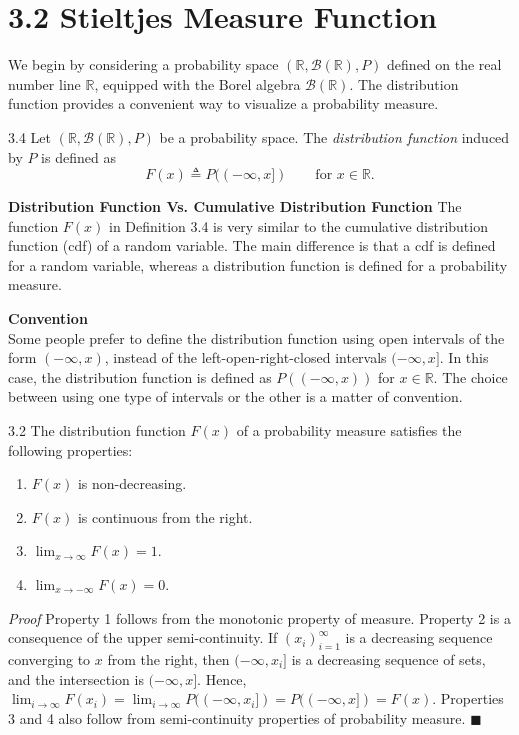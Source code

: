 \section*{3.2 Stieltjes Measure Function}

We begin by considering a probability space $(\mathbb{R}, \mathcal{B}(\mathbb{R}), P)$ defined on the real number line $\mathbb{R}$, equipped with the Borel algebra $\mathcal{B}(\mathbb{R})$. The distribution function provides a convenient way to visualize a probability measure.

\begin{defbox}{3.4}
Let $(\mathbb{R}, \mathcal{B}(\mathbb{R}), P)$ be a probability space. The \textit{distribution function} induced by $P$ is defined as
\[
F(x) \triangleq P((-\infty, x]) \qquad \text{for } x \in \mathbb{R}.
\]
\end{defbox}


\textbf{Distribution Function Vs. Cumulative Distribution Function} The function $F(x)$ in Definition 3.4 is very similar to the cumulative distribution function (cdf) of a random variable. The main difference is that a cdf is defined for a random variable, whereas a distribution function is defined for a probability measure.

\textbf{Convention} \\
Some people prefer to define the distribution function using open intervals of the form $(-\infty, x)$, instead of the left-open-right-closed intervals $(-\infty, x]$. In this case, the distribution function is defined as $P((-\infty, x))$ for $x \in \mathbb{R}$. The choice between using one type of intervals or the other is a matter of convention.

\begin{thmbox}{3.2}
The distribution function $F(x)$ of a probability measure satisfies the following properties:
\begin{enumerate}
    \item $F(x)$ is non-decreasing.
    \item $F(x)$ is continuous from the right.
    \item $\lim_{x \to \infty} F(x) = 1$.
    \item $\lim_{x \to -\infty} F(x) = 0$.
\end{enumerate}
\end{thmbox}

\noindent\textit{Proof} Property 1 follows from the monotonic property of measure. Property 2 is a consequence of the upper semi-continuity. If $(x_i)_{i=1}^{\infty}$ is a decreasing sequence converging to $x$ from the right, then $(-\infty, x_i]$ is a decreasing sequence of sets, and the intersection is $(-\infty, x]$. Hence, $\lim_{i \to \infty} F(x_i) = \lim_{i \to \infty} P((-\infty, x_i]) = P((-\infty, x]) = F(x)$. Properties 3 and 4 also follow from semi-continuity properties of probability measure. \hfill $\blacksquare$

